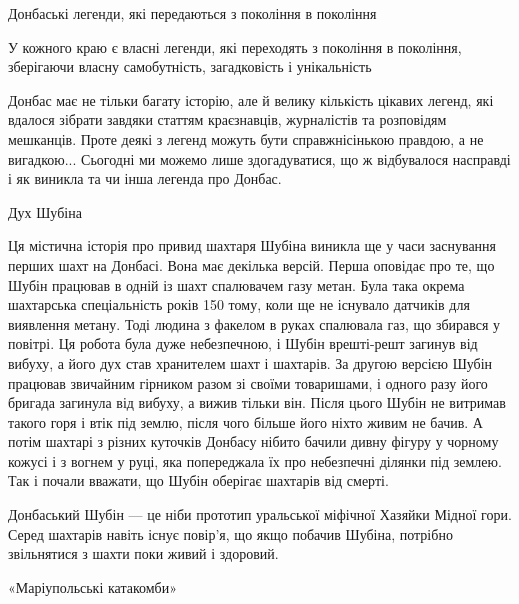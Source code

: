 
 
 
 
 

Донбаські легенди, які передаються з покоління в покоління

У кожного краю є власні легенди, які переходять з покоління в покоління,
зберігаючи власну самобутність, загадковість і унікальність

Донбас має не тільки багату історію, але й велику кількість цікавих легенд, які
вдалося зібрати завдяки статтям краєзнавців, журналістів та розповідям
мешканців. Проте деякі з легенд можуть бути справжнісінькою правдою, а не
вигадкою... Сьогодні ми можемо лише здогадуватися, що ж відбувалося насправді і
як виникла та чи інша легенда про Донбас.

Дух Шубіна

Ця містична історія про привид шахтаря Шубіна виникла ще у часи заснування
перших шахт на Донбасі. Вона має декілька версій. Перша оповідає про те, що
Шубін працював в одній із шахт спалювачем газу метан. Була така окрема
шахтарська спеціальність років 150 тому, коли ще не існувало датчиків для
виявлення метану. Тоді людина з факелом в руках спалювала газ, що збирався у
повітрі. Ця робота була дуже небезпечною, і Шубін врешті-решт загинув від
вибуху, а його дух став хранителем шахт і шахтарів. За другою версією Шубін
працював звичайним гірником разом зі своїми товаришами, і одного разу його
бригада загинула від вибуху, а вижив тільки він. Після цього Шубін не витримав
такого горя і втік під землю, після чого більше його ніхто живим не бачив. А
потім шахтарі з різних куточків Донбасу нібито бачили дивну фігуру у чорному
кожусі і з вогнем у руці, яка попереджала їх про небезпечні ділянки під землею.
Так і почали вважати, що Шубін оберігає шахтарів від смерті.

Донбаський Шубін — це ніби прототип уральської міфічної Хазяйки Мідної гори.
Серед шахтарів навіть існує повір'я, що якщо побачив Шубіна, потрібно
звільнятися з шахти поки живий і здоровий.

«Маріупольські катакомби»

